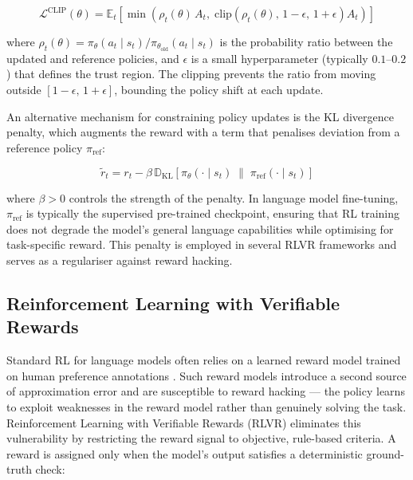 \documentclass{iutbscthesis}
\begin{document}
\begin{equation}
    \mathcal{L}^{\text{CLIP}}(\theta) = \mathbb{E}_t\!\left[
        \min\!\left(
            \rho_t(\theta)\, A_t,\;
            \text{clip}\!\left(\rho_t(\theta),\, 1{-}\epsilon,\, 1{+}\epsilon\right) A_t
        \right)
    \right]
\end{equation}

\noindent where $\rho_t(\theta) = \pi_\theta(a_t \mid s_t) / \pi_{\theta_{\text{old}}}(a_t \mid s_t)$ is the
probability ratio between the updated and reference policies, and $\epsilon$ is a small
hyperparameter (typically $0.1$--$0.2$) that defines the trust region. The clipping
prevents the ratio from moving outside $[1{-}\epsilon,\, 1{+}\epsilon]$, bounding the policy
shift at each update.

An alternative mechanism for constraining policy updates is the KL divergence
penalty, which augments the reward with a term that penalises deviation from a
reference policy $\pi_{\text{ref}}$:

\begin{equation}
    \tilde{r}_t = r_t - \beta\, \mathbb{D}_{\text{KL}}\!\left[\pi_\theta(\cdot \mid s_t)
        \;\|\; \pi_{\text{ref}}(\cdot \mid s_t)\right]
\end{equation}

\noindent where $\beta > 0$ controls the strength of the penalty. In language model fine-tuning,
$\pi_{\text{ref}}$ is typically the supervised pre-trained checkpoint, ensuring that RL training
does not degrade the model's general language capabilities while optimising for
task-specific reward. This penalty is employed in several RLVR frameworks and
serves as a regulariser against reward hacking.

\subsection{Reinforcement Learning with Verifiable Rewards}

Standard RL for language models often relies on a learned reward model trained on
human preference annotations \cite{ouyang2022training}. Such reward models introduce
a second source of approximation error and are susceptible to reward hacking — the
policy learns to exploit weaknesses in the reward model rather than genuinely solving
the task. Reinforcement Learning with Verifiable Rewards (RLVR)
\cite{lightman2023lets} eliminates this vulnerability by restricting the reward signal
to objective, rule-based criteria. A reward is assigned only when the model's output
satisfies a deterministic ground-truth check:
\end{document}
